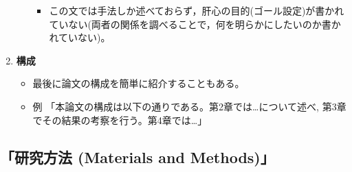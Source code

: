 \documentclass[12pt, ]{jsarticle}
\providecommand{\tightlist}{%
   \setlength{\itemsep}{0pt}\setlength{\parskip}{0pt}}
\begin{document}
\begin{enumerate}
\begin{itemize}
    \begin{itemize}
    \tightlist
    \item
      この文では手法しか述べておらず，肝心の目的(ゴール設定)が書かれていない(両者の関係を調べることで，何を明らかにしたいのか書かれていない)。
    \end{itemize}
  \end{itemize}
\item
  \textbf{構成}

  \begin{itemize}
  \tightlist
  \item
    最後に論文の構成を簡単に紹介することもある。
  \item
    例 「本論文の構成は以下の通りである。第2章では\ldots について述べ,
    第3章でその結果の考察を行う。第4章では\ldots」
  \end{itemize}
\end{enumerate}

\hypertarget{ux7814ux7a76ux65b9ux6cd5-materials-and-methods}{%
\subsection{「研究方法 (Materials and
Methods)」}\label{ux7814ux7a76ux65b9ux6cd5-materials-and-methods}}
\end{document}
